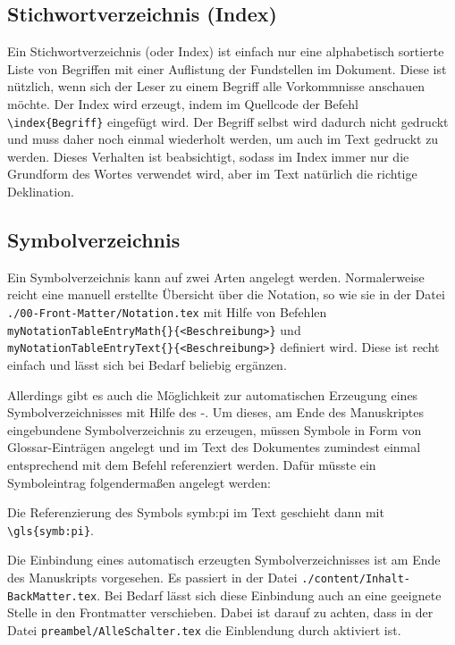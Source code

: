 \subsection{Stichwortverzeichnis (Index)}%
\label{sec:Index}
%
Ein Stichwortverzeichnis (oder
Index)
ist einfach nur eine alphabetisch sortierte Liste von Begriffen mit einer Auflistung der Fundstellen im Dokument.
Diese ist nützlich, wenn sich der Leser zu einem Begriff alle Vorkommnisse anschauen möchte.
Der Index wird erzeugt, indem im Quellcode der Befehl \verb+\index{Begriff}+
eingefügt wird. Der Begriff selbst wird dadurch nicht gedruckt und muss daher
noch einmal wiederholt werden, um auch im Text gedruckt zu werden. Dieses Verhalten
ist beabsichtigt, sodass im Index immer nur die Grundform des Wortes verwendet
wird, aber im Text natürlich die richtige Deklination.


\subsection{Symbolverzeichnis}%
\label{sec:Symbolverz}
%
Ein Symbolverzeichnis kann auf zwei Arten angelegt werden.
Normalerweise reicht eine manuell erstellte Übersicht über die Notation,
so wie sie in der Datei \texttt{./00-Front-Matter/Notation.tex}
mit Hilfe von Befehlen
\texttt{\bs myNotationTableEntryMath\{<Mathe-Ausdruck>\}\{<Beschreibung>\}}
und
\texttt{\bs myNotationTableEntryText\{<Text-Ausdruck>\}\{<Beschreibung>\}}
definiert wird.
Diese ist recht einfach und lässt sich bei Bedarf beliebig ergänzen.

Allerdings gibt es auch die Möglichkeit zur automatischen Erzeugung eines
Symbolverzeichnisses mit Hilfe des -.
Um dieses, am Ende des Manuskriptes eingebundene Symbolverzeichnis zu erzeugen,
müssen Symbole in Form von Glossar-Einträgen angelegt und im Text des Dokumentes
zumindest einmal entsprechend mit dem Befehl  referenziert werden.
Dafür müsste ein Symboleintrag folgendermaßen angelegt werden:
\begin{latex}[caption={Definition eines Symboleintrages},label={lst:SymbEntry}]
\end{latex}
Die Referenzierung des Symbols \gls{symb:pi} im Text geschieht dann mit \verb+\gls{symb:pi}+.

Die Einbindung eines automatisch erzeugten Symbolverzeichnisses ist am Ende des Manuskripts vorgesehen.
Es passiert in der Datei
\texttt{./content/Inhalt-BackMatter.tex}.
Bei Bedarf lässt sich diese Einbindung auch an eine geeignete Stelle in den Frontmatter verschieben.
Dabei ist darauf zu achten, dass in der Datei \texttt{preambel/AlleSchalter.tex}
die Einblendung durch  aktiviert ist.
